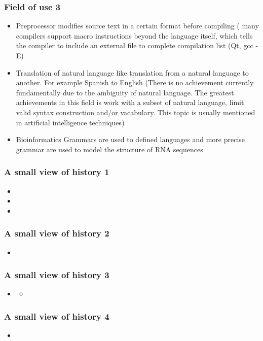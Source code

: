 \documentclass{beamer}
\begin{document}
\begin{frame}
\frametitle{Field of use 3}
\begin{itemize}
\item Preprocessor modifies source text in a certain format before compiling ( many compilers support macro instructions beyond the language itself, which tells the compiler to include an external file to complete compilation list (Qt, gcc -E)
\item Translation of natural language like translation from a natural language to another. For example Spanish to English (There is no achievement currently fundamentally due to the ambiguity of natural language. The greatest achievements in this field is work with a subset of natural language, limit valid syntax construction and/or vacabulary. This topic is usually mentioned in artificial intelligence techniques)
\item Bioinformatics Grammars are used to defined languages and more precise grammar are used to model the structure of RNA sequences
\end{itemize}
\end{frame}
\begin{frame}
\frametitle{A small view of history 1}
\begin{itemize}
\item
\item
\item
\end{itemize}
\end{frame}
\begin{frame}
\frametitle{A small view of history 2}
\begin{itemize}
\item
\end{itemize}
\end{frame}
\begin{frame}
\frametitle{A small view of history 3}
\begin{itemize}
\item
\begin{itemize}
\item
\end{itemize}
\end{itemize}
\end{frame}
\begin{frame}
\frametitle{A small view of history 4}
\begin{itemize}
\item
\end{itemize}
\end{frame}
\end{document}
